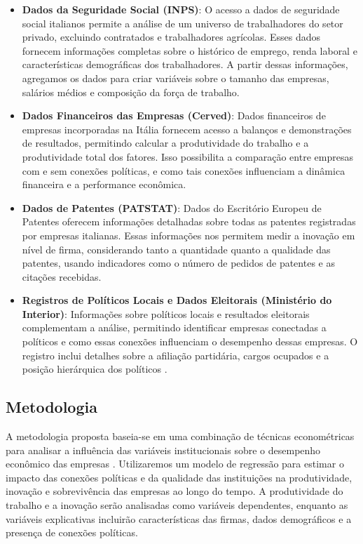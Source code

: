 \begin{itemize}
    \item \textbf{Dados da Seguridade Social (INPS)}: O acesso a dados de seguridade social italianos permite a análise de um universo de trabalhadores do setor privado, excluindo contratados e trabalhadores agrícolas. Esses dados fornecem informações completas sobre o histórico de emprego, renda laboral e características demográficas dos trabalhadores. A partir dessas informações, agregamos os dados para criar variáveis sobre o tamanho das empresas, salários médios e composição da força de trabalho.
    
    \item \textbf{Dados Financeiros das Empresas (Cerved)}: Dados financeiros de empresas incorporadas na Itália fornecem acesso a balanços e demonstrações de resultados, permitindo calcular a produtividade do trabalho e a produtividade total dos fatores. Isso possibilita a comparação entre empresas com e sem conexões políticas, e como tais conexões influenciam a dinâmica financeira e a performance econômica.
    
    \item \textbf{Dados de Patentes (PATSTAT)}: Dados do Escritório Europeu de Patentes oferecem informações detalhadas sobre todas as patentes registradas por empresas italianas. Essas informações nos permitem medir a inovação em nível de firma, considerando tanto a quantidade quanto a qualidade das patentes, usando indicadores como o número de pedidos de patentes e as citações recebidas.
    
    \item \textbf{Registros de Políticos Locais e Dados Eleitorais (Ministério do Interior)}: Informações sobre políticos locais e resultados eleitorais complementam a análise, permitindo identificar empresas conectadas a políticos e como essas conexões influenciam o desempenho dessas empresas. O registro inclui detalhes sobre a afiliação partidária, cargos ocupados e a posição hierárquica dos políticos \cite{martes_2010}.
\end{itemize}

\subsection*{Metodologia}

A metodologia proposta baseia-se em uma combinação de técnicas econométricas para analisar a influência das variáveis institucionais sobre o desempenho econômico das empresas \cite{artigo1-SchumpeterianGrowthModel}. Utilizaremos um modelo de regressão para estimar o impacto das conexões políticas e da qualidade das instituições na produtividade, inovação e sobrevivência das empresas ao longo do tempo. A produtividade do trabalho e a inovação serão analisadas como variáveis dependentes, enquanto as variáveis explicativas incluirão características das firmas, dados demográficos e a presença de conexões políticas.


